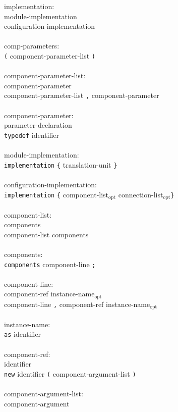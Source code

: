 \documentclass[11pt,letterpaper]{article}
\newcommand{\kw}[1]{{\tt #1}}
\newcommand{\opt}{$_{\mbox{opt}}$\xspace}
\begin{document}
\begin{tabbing}
implementation:\\
\>	module-implementation\\
\>	configuration-implementation\\
\\
comp-parameters:\\
\>	\kw{(} component-parameter-list \kw{)}\\
\\
component-parameter-list:\\
\>	component-parameter\\
\>	component-parameter-list \kw{,} component-parameter\\
\\
component-parameter:\\
\>	parameter-declaration\\
\>	\kw{typedef} identifier\\
\\
module-implementation:\\
\>	\kw{implementation} \kw{\{} translation-unit \kw{\}}\\
\\
configuration-implementation:\\
\>	\kw{implementation} \kw{\{} component-list\opt connection-list\opt \kw{\}}\\
\\
component-list:\\
\>	components\\
\>	component-list components\\
\\
components:\\
\>	\kw{components} component-line \kw{;}\\
\\
component-line:\\
\>	component-ref instance-name\opt\\
\>	component-line \kw{,} component-ref instance-name\opt\\
\\
instance-name:\\
\>	\kw{as} identifier\\
\\
component-ref:\\
\>	identifier\\
\>	\kw{new} identifier \kw{(} component-argument-list \kw{)}\\
\\
component-argument-list:\\
\>	component-argument\\

\end{tabbing}
\end{document}
